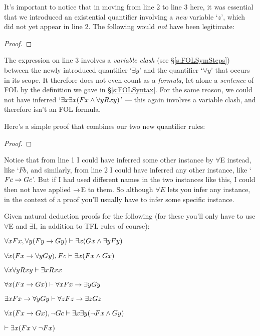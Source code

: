 It's important to notice that in moving from line 2 to line 3 here, it was essential that we introduced an existential quantifier involving a \emph{new} variable `$z$', which did not yet appear in line 2.  The following would \emph{not} have been legitimate:

\begin{proof}
	 
\end{proof}
The expression on line 3 involves a \emph{variable clash} (see \S\ref{s:FOLSymSteps}) between the newly introduced quantifier `$\exists y$' and the quantifier `$\forall y$' that occurs in its scope.  It therefore does not even count as a \emph{formula}, let alone a \emph{sentence} of FOL by the definition we gave in \S\ref{s:FOLSyntax}.  For the same reason, we could not have inferred `$\exists x\exists x(Fx \wedge \forall y Rxy)$' --- this again involves a variable clash, and therefore isn't an FOL formula.

Here's a simple proof that combines our two new quantifier rules:
\begin{proof}
\end{proof}
\noindent Notice that from line 1 I could have inferred some other instance by $\forall$E instead, like `$Fb$, and similarly, from line 2 I could have inferred any other instance, like `$Fc \rightarrow Gc$'. But if I had used different names in the two instances like this, I could then not have applied $\rightarrow$E to them.  So although $\forall E$ lets you infer any instance, in the context of a proof you'll usually have to infer some specific instance.

\practiceproblems
\problempart Given natural deduction proofs for the following (for these you'll only have to use $\forall$E and $\exists$I, in addition to TFL rules of course):


\begin{earg}
\item $\forall xFx, \forall y (Fy \rightarrow Gy) \vdash \exists x(Gx \wedge \exists yFy)$
\item $\forall x(Fx \rightarrow \forall yGy), Fc \vdash \exists x(Fx \wedge Gx)$
\item $\forall x \forall y Rxy \vdash \exists x Rxx$
\item $\forall x(Fx \rightarrow Gx) \vdash \forall xFx \rightarrow \exists yGy$
\item $\exists xFx \rightarrow \forall y Gy \vdash \forall z Fz \rightarrow \exists zGz$
\item $\forall x(Fx \rightarrow Gx), \neg Gc \vdash \exists x\exists y(\neg Fx \wedge Gy)$
\item $\vdash \exists x(Fx \vee \neg Fx)$
\end{earg}




